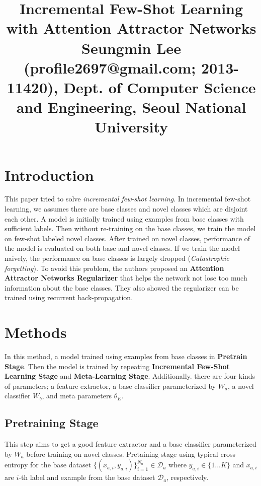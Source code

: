 \documentclass[10pt,twocolumn,letterpaper]{article}
\newcommand{\Da}{\mathcal{D}_a}
\newcommand{\Wa}{W_a}
\newcommand{\Wb}{W_b}
\begin{document}
\title{Incremental Few-Shot Learning with Attention Attractor Networks\\ {\rm {\normalsize Seungmin Lee (profile2697@gmail.com; 2013-11420), Dept. of Computer Science and Engineering, Seoul National University}}}   %

\maketitle
\thispagestyle{empty}

\section{Introduction}
This paper tried to solve \textit{incremental few-shot learning}. In incremental few-shot learning, we assumes there are base classes and novel classes which are disjoint each other. A model is initially trained using examples from base classes with sufficient labels. Then without re-training on the base classes, we train the model on few-shot labeled novel classes. After trained on novel classes, performance of the model is evaluated on both base and novel classes. If we train the model naively, the performance on base classes is largely dropped (\textit{Catastrophic forgetting}). To avoid this problem, the authors proposed an \textbf{Attention Attractor Networks Regularizer} that helps the network not lose too much information about the base classes. They also showed the regularizer can be trained using recurrent back-propagation.

\section{Methods}
In this method, a model trained using examples from base classes in \textbf{Pretrain Stage}. Then the model is trained by repeating \textbf{Incremental Few-Shot Learning Stage} and \textbf{Meta-Learning Stage}. Additionally. there are four kinds of parameters; a feature extractor, a base classifier parameterized by $\Wa$, a novel classifier $\Wb$, and meta parameters $\theta_{E}$.

\subsection{Pretraining Stage}\label{pretrain}

This step aims to get a good feature extractor and a base classifier parameterized by $W_a$ before training on novel classes. Pretaining stage using typical cross entropy for the base dataset $\{(x_{a,i},y_{a,i})\}_{i=1}^{N_a}\in\Da$ where $y_{a,i}\in\{1...K\}$ and $x_{a, i}$ are $i$-th label and example from the base dataset $\Da$, respectively. 
\end{document}
